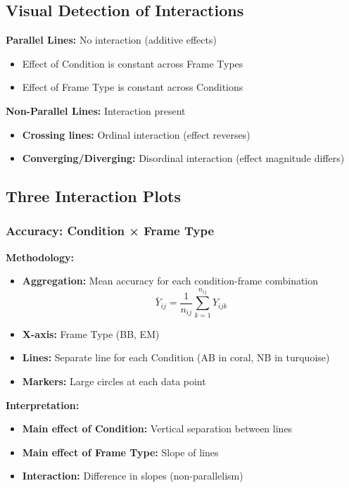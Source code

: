 \documentclass[12pt,a4paper]{article}
\begin{document}
\subsection{Visual Detection of Interactions}

\textbf{Parallel Lines:} No interaction (additive effects)
\begin{itemize}
    \item Effect of Condition is constant across Frame Types
    \item Effect of Frame Type is constant across Conditions
\end{itemize}

\textbf{Non-Parallel Lines:} Interaction present
\begin{itemize}
    \item \textbf{Crossing lines:} Ordinal interaction (effect reverses)
    \item \textbf{Converging/Diverging:} Disordinal interaction (effect magnitude differs)
\end{itemize}

\subsection{Three Interaction Plots}

\subsubsection{Accuracy: Condition × Frame Type}

\textbf{Methodology:}
\begin{itemize}
    \item \textbf{Aggregation:} Mean accuracy for each condition-frame combination
        \begin{equation}
            \bar{Y}_{ij} = \frac{1}{n_{ij}} \sum_{k=1}^{n_{ij}} Y_{ijk}
        \end{equation}
    \item \textbf{X-axis:} Frame Type (BB, EM)
    \item \textbf{Lines:} Separate line for each Condition (AB in coral, NB in turquoise)
    \item \textbf{Markers:} Large circles at each data point
\end{itemize}

\textbf{Interpretation:}
\begin{itemize}
    \item \textbf{Main effect of Condition:} Vertical separation between lines
    \item \textbf{Main effect of Frame Type:} Slope of lines
    \item \textbf{Interaction:} Difference in slopes (non-parallelism)
\end{itemize}
\end{document}
